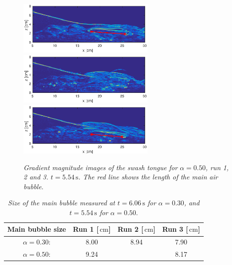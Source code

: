 \documentclass[review, authoryear]{elsarticle}
\newcommand{\s}{\,\mbox{s}}
\newcommand{\cm}{\,\mbox{cm}}
\begin{document}
\begin{figure}[]
\centering
\includegraphics[width=0.6\textwidth]{./Figures/BUBBLE/bubble_50_run1.eps}
\includegraphics[width=0.6\textwidth]{./Figures/BUBBLE/bubble_50_run2.eps}
\includegraphics[width=0.6\textwidth]{./Figures/BUBBLE/bubble_50_run3.eps}
\caption{\textit{Gradient magnitude images of the swash tongue for $\alpha=0.50$, run 1, 2 and 3. $t=5.54\s$. The red line shows the length of the main air bubble}.}
\label{fig:bubble_50}
\end{figure} 


\begin{table}[]
\centering
\caption{\textit{ Size of the main bubble measured at $t=6.06\s$ for $\alpha=0.30$, and $t=5.54\s$ for $\alpha=0.50$}.}
\label{my-label}
\begin{tabular}{|c|c|c|c|}
\hline
\textbf{Main bubble size }              & \textbf{Run 1 {[}$\cm${]}} & \textbf{Run 2 {[}$\cm${]}} & \textbf{Run 3 {[}$\cm${]}} \\ \hline
$\alpha=0.30$:  & 8.00     & 8.94     & 7.90     \\ \hline
$\alpha=0.50$: & 9.24     &      & 8.17     \\ \hline
\end{tabular}
\label{tab:b_case30}
\end{table}
 
 
\end{document}
